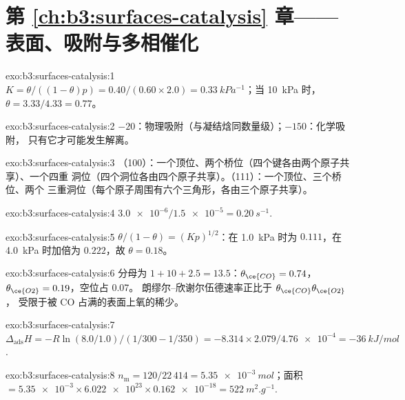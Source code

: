 \section*{第 \ref{ch:b3:surfaces-catalysis} 章——表面、吸附与多相催化}

\begin{solution}{exo:b3:surfaces-catalysis:1}
$K = \theta/((1 - \theta)p) = 0.40/(0.60 \times 2.0) = \qty{0.33}{kPa^{-1}}$；当 \qty{10}{kPa} 时，$\theta = 3.33/4.33 = 0.77$。
\end{solution}

\begin{solution}{exo:b3:surfaces-catalysis:2}
$-20$：物理吸附（与凝结焓同数量级）；$-150$：化学吸附，
只有它才可能发生解离。
\end{solution}

\begin{solution}{exo:b3:surfaces-catalysis:3}
（100）：一个顶位、两个桥位（四个键各由两个原子共享）、一个四重
洞位（四个洞位各由四个原子共享）。（111）：一个顶位、三个桥位、两个
三重洞位（每个原子周围有六个三角形，各由三个原子共享）。
\end{solution}

\begin{solution}{exo:b3:surfaces-catalysis:4}
$\num{3.0e-6}/\num{1.5e-5} = \qty{0.20}{s^{-1}}$.
\end{solution}

\begin{solution}{exo:b3:surfaces-catalysis:5}
$\theta/(1 - \theta) = (Kp)^{1/2}$：在 \qty{1.0}{kPa} 时为 $0.111$，在 \qty{4.0}{kPa} 时加倍为 $0.222$，故 $\theta = 0.18$。
\end{solution}

\begin{solution}{exo:b3:surfaces-catalysis:6}
分母为 $1 + 10 + 2.5 = 13.5$：$\theta_{\ce{CO}} = 0.74$，$\theta_{\ce{O2}} = 0.19$，空位占 0.07。
朗缪尔–欣谢尔伍德速率正比于 $\theta_{\ce{CO}}\theta_{\ce{O2}}$，
受限于被 CO 占满的表面上氧的稀少。
\end{solution}

\begin{solution}{exo:b3:surfaces-catalysis:7}
$\Delta_{\mathrm{ads}}H = -R\ln(8.0/1.0)/(1/300 - 1/350) = -8.314 \times 2.079/\num{4.76e-4} = \qty{-36}{kJ/mol}$.
\end{solution}

\begin{solution}{exo:b3:surfaces-catalysis:8}
$n_{\mathrm m} = 120/22\,414 = \qty{5.35e-3}{mol}$；面积 $= \num{5.35e-3} \times \num{6.022e23} \times \num{0.162e-18} =
\qty{522}{m^2.g^{-1}}$.
\end{solution}

